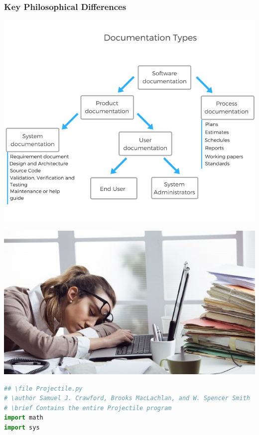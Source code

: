\documentclass[usenames,dvipsnames,10pt]{beamer}
\begin{document}
\begin{frame}[fragile]
  
  \frametitle{Key Philosophical Differences}
\begin{minipage}{0.48\textwidth}
\includegraphics[width=1.0\textwidth]{DocKinds.png}
\end{minipage}
\begin{minipage}{0.48\textwidth}
\includegraphics[width=1.0\textwidth]{BoredAtWork.jpg}
\end{minipage}


\begin{lstlisting}[language=Python,basicstyle=\ttfamily\tiny,
  keywordstyle=\bfseries,breaklines=false]
## \file Projectile.py
# \author Samuel J. Crawford, Brooks MacLachlan, and W. Spencer Smith
# \brief Contains the entire Projectile program
import math
import sys


\end{lstlisting}
\end{frame}
\end{document}
